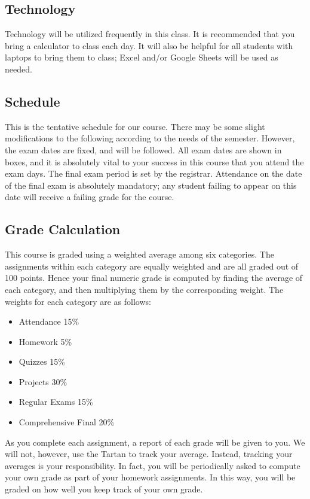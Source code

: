 \documentclass[11pt]{article}
\begin{document}
\subsection*{Technology}
Technology will be utilized frequently in this class. It is recommended that you bring a calculator to
class each day. It will also be helpful for all students with laptops to bring them to class; Excel and/or Google Sheets will be
used as needed.


\newpage
\subsection*{Schedule}

This is the tentative schedule for our course.  There may be some
slight modifications to the following according to the needs of the
semester. However, the exam dates are fixed, and will be followed.
All exam dates are shown in boxes, and it is absolutely vital to
your success in this course that you attend the exam days.  The final
exam period is set by the registrar.  Attendance on the date of the
final exam is absolutely mandatory; any student failing to appear on
this date will receive a failing grade for the course.



\subsection*{Grade Calculation}
This course is graded using a weighted average among six categories.  The assignments 
within each category are equally weighted and are all graded out of 100 points.  Hence your final numeric grade is computed by
finding the average of each category, and then multiplying them by the corresponding weight. The
weights for each category are as follows:

\begin{itemize}
    \item Attendance 15\%
    \item Homework 5\%
    \item Quizzes 15\%
    \item Projects 30\%
    \item Regular Exams 15\%
    \item Comprehensive Final 20\%
\end{itemize}

As you complete each assignment, a report of each grade will be given to you.  We will
not, however, use the Tartan to track your average.  Instead, tracking your averages
is your responsibility.  In fact, you will be periodically asked to compute your own grade
as part of your homework assignments.  In this way, you will be graded on how well you keep track of your
own grade.
\end{document}
